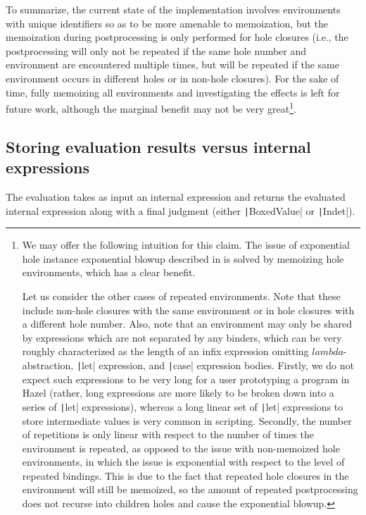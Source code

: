 To summarize, the current state of the implementation involves environments with unique identifiers so as to be more amenable to memoization, but the memoization during postprocessing is only performed for hole closures (i.e., the postprocessing will only not be repeated if the same hole number and environment are encountered multiple times, but will be repeated if the same environment occurs in different holes or in non-hole closures). For the sake of time, fully memoizing all environments and investigating the effects is left for future work, although the marginal benefit may not be very great\footnote{
  We may offer the following intuition for this claim. The issue of exponential hole instance exponential blowup described in  is solved by memoizing hole environments, which has a clear benefit.

  Let us consider the other cases of repeated environments. Note that these include non-hole closures with the same environment or in hole closures with a different hole number. Also, note that an environment may only be shared by expressions which are not separated by any binders, which can be very roughly characterized as the length of an infix expression omitting $lambda$-abstraction, \texttt|let| expression, and \texttt|case| expression bodies. Firstly, we do not expect such expressions to be very long for a user prototyping a program in Hazel (rather, long expressions are more likely to be broken down into a series of \texttt|let| expressions), whereas a long linear set of \texttt|let| expressions to store intermediate values is very common in scripting. Secondly, the number of repetitions is only linear with respect to the number of times the environment is repeated, as opposed to the issue with non-memoized hole environments, in which the issue is exponential with respect to the level of repeated bindings. This is due to the fact that repeated hole closures in the environment will still be memoized, so the amount of repeated postprocessing does not recurse into children holes and cause the exponential blowup.
}.

\subsection{Storing evaluation results versus internal expressions}
\label{sec:result-vs-dhexp}

The evaluation takes as input an internal expression and returns the evaluated internal expression along with a \textsf{final} judgment (either \texttt|BoxedValue| or \texttt|Indet|).

